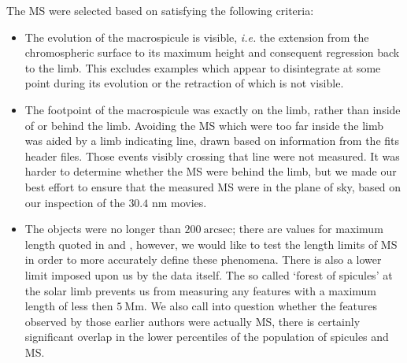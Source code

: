 The MS were selected based on satisfying the following criteria: 
\begin{itemize}
	\item{ The evolution of the macrospicule is visible, \emph{i.e.} the extension from the chromospheric surface to its maximum height and consequent regression back to the limb. This excludes examples which appear to disintegrate at some point during its evolution or the retraction of which is not visible.}
	\item{The footpoint of the macrospicule was exactly on the limb, rather than inside of or behind the limb. Avoiding the MS which were too far inside the limb was aided by a limb indicating line, drawn based on information from the fits header files. Those events visibly crossing that line were not measured. It was harder to determine whether the MS were behind the limb, but we made our best effort to ensure that the measured MS were in the plane of sky, based on our inspection of the $30.4$ nm movies.}
	\item{The objects were no longer than $200\ \textrm{arcsec}$; there are values for maximum length quoted in \cite{Bohlin1975} and \cite{Dere89}, however, we would like to test the length limits of MS in order to more accurately define these phenomena. There is also a lower limit imposed upon us by the data itself. The so called `forest of spicules' at the solar limb prevents us from measuring any features with a maximum length of less then $5\ \textrm{Mm}$. We also call into question whether the features observed by those earlier authors were actually MS, there is certainly significant overlap in the lower percentiles of the population of spicules and MS.}
\end{itemize}


